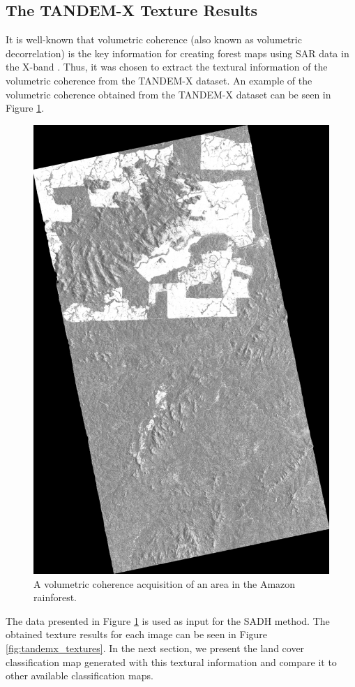 \subsection{The TANDEM-X Texture Results}
It is well-known that volumetric coherence (also known as volumetric decorrelation) is the key information for creating forest maps using SAR data in the X-band \cite{Paolo,Rizzoli, Alberto}. Thus, it was chosen to extract the textural information of the volumetric coherence from the TANDEM-X dataset. An example of the volumetric coherence obtained from the TANDEM-X dataset can be seen in Figure \ref{fig:gamma_vol_tandemx}.
\begin{figure}[H]
    \centering
    \includegraphics[width=0.7\linewidth]{Cap3-Results/coSSC_master_gamma_vol.png}
    \caption{A volumetric coherence acquisition of an area in the Amazon rainforest.}
    \label{fig:gamma_vol_tandemx}
\end{figure}

The data presented in Figure \ref{fig:gamma_vol_tandemx} is used as input for the SADH method. The obtained texture results for each image can be seen in Figure \ref{fig:tandemx_textures}. In the next section, we present the land cover classification map generated with this textural information and compare it to other available classification maps.

